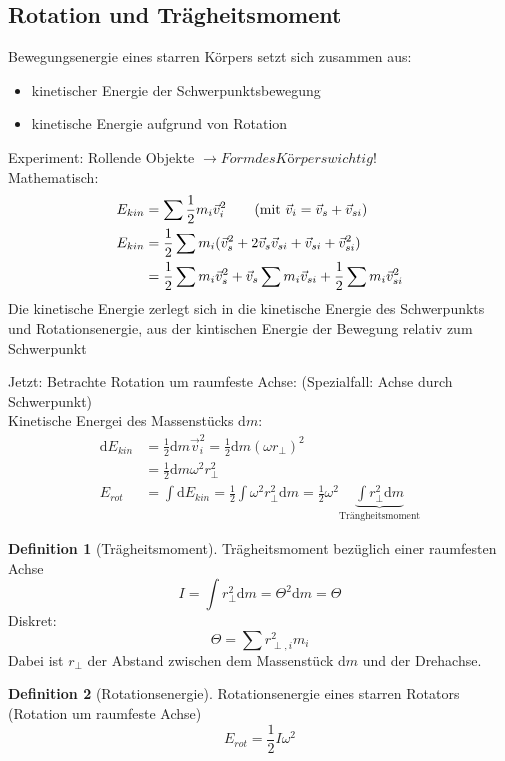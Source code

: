 \documentclass[a4paper]{scrartcl}
\renewcommand{\d}{\mathrm{d}}
\renewcommand{\v}[1]{\vec{#1}}
\theoremstyle{definition}
\newtheorem{defn}{Definition}
\theoremstyle{plain}
\theoremstyle{plain}
\theoremstyle{remark}
\theoremstyle{remark}
\theoremstyle{remark}
\begin{document}
\subsection{Rotation und Trägheitsmoment}
\label{sec-8-4}
Bewegungsenergie eines starren Körpers setzt sich zusammen aus:
\begin{itemize}
\item kinetischer Energie der Schwerpunktsbewegung
\item kinetische Energie aufgrund von Rotation
\end{itemize}
Experiment: Rollende Objekte $\rightarrow Form des Körpers wichtig!$ \\
   Mathematisch:
\begin{align*}
E_{kin} &= \sum \frac{1}{2} m_i \v v_i^2 \tag{mit $\v v_i = \v v_s + \v v_{si}$} \\
E_{kin} &= \frac{1}{2} \sum m_i (\v v_s^2 + 2\v v_s \v v_{si} + \v v_{si} + \v v_{si}^2) \\
&= \frac{1}{2} \sum m_i \v v_s^2 + \v v_s \sum m_i \v v_{si} + \frac{1}{2} \sum m_i \v v_{si}^2 \\
\end{align*}
Die kinetische Energie zerlegt sich in die kinetische Energie des Schwerpunkts und Rotationsenergie, aus der kintischen Energie der Bewegung relativ zum Schwerpunkt

Jetzt: Betrachte Rotation um raumfeste Achse: (Spezialfall: Achse durch Schwerpunkt) \\
   Kinetische Energei des Massenstücks $\d m$:
\begin{align*}
\d E_{kin} &= \frac{1}{2} \d m \v v_i^2 = \frac{1}{2} \d m (\omega r_{\perp})^2 \\
&= \frac{1}{2} \d m \omega^2 r_\perp^2 \\
E_{rot} &= \int \d E_{kin} = \frac{1}{2} \int \omega^2 r_{\perp}^2 \d m = \frac{1}{2} \omega^2 \underbrace{\int r_\perp^2 \d m}_{\text{Trängheitsmoment}}
\end{align*}


\begin{defn}[Trägheitsmoment]
Trägheitsmoment bezüglich einer raumfesten Achse
\[I = \int r_{\perp}^2 \d m = \Theta^2 \d m = \Theta\]
Diskret:
\[\Theta = \sum r_{\perp,i}^2 m_i\]
Dabei ist $r_\perp$ der Abstand zwischen dem Massenstück $\d m$  und der Drehachse.
\end{defn}
\begin{defn}[Rotationsenergie]
Rotationsenergie eines starren Rotators (Rotation um raumfeste Achse)
\[E_{rot} = \frac{1}{2} I \omega^2\]
\end{defn}
\end{document}

